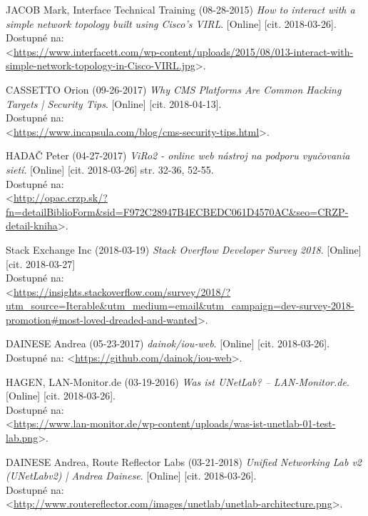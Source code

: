 \begin{thebibliography}{99}
JACOB Mark, Interface Technical Training (08-28-2015) {\it How to interact with a simple network topology built using Cisco’s VIRL}. [Online] [cit. 2018-03-26]. \\
Dostupné na: \\
<\url{https://www.interfacett.com/wp-content/uploads/2015/08/013-interact-with-simple-network-topology-in-Cisco-VIRL.jpg}>.

CASSETTO Orion (09-26-2017) {\it Why CMS Platforms Are Common Hacking Targets | Security Tips}. [Online] [cit. 2018-04-13]. \\
Dostupné na: \\
<\url{https://www.incapsula.com/blog/cms-security-tips.html}>.

HADAČ Peter (04-27-2017) {\it ViRo2 - online web nástroj na podporu vyučovania sietí}. [Online] [cit. 2018-03-26] str. 32-36, 52-55. \\
Dostupné na: \\
<\url{http://opac.crzp.sk/?fn=detailBiblioForm&sid=F972C28947B4ECBEDC061D4570AC&seo=CRZP-detail-kniha}>.

Stack Exchange Inc (2018-03-19) {\it Stack Overflow Developer Survey 2018}. [Online] [cit. 2018-03-27] \\
Dostupné na: \\
<\url{https://insights.stackoverflow.com/survey/2018/?utm_source=Iterable&utm_medium=email&utm_campaign=dev-survey-2018-promotion#most-loved-dreaded-and-wanted}>.

DAINESE Andrea (05-23-2017) {\it dainok/iou-web}. [Online] [cit. 2018-03-26]. \\
Dostupné na: <\url{https://github.com/dainok/iou-web}>.

HAGEN, LAN-Monitor.de  (03-19-2016) {\it Was ist UNetLab? – LAN-Monitor.de}. [Online] [cit. 2018-03-26]. \\
Dostupné na: \\
<\url{https://www.lan-monitor.de/wp-content/uploads/was-ist-unetlab-01-test-lab.png}>.

DAINESE Andrea, Route Reflector Labs (03-21-2018) {\it Unified Networking Lab v2 (UNetLabv2) | Andrea Dainese}. [Online] [cit. 2018-03-26]. \\
Dostupné na: \\
<\url{http://www.routereflector.com/images/unetlab/unetlab-architecture.png}>.


\end{thebibliography}
